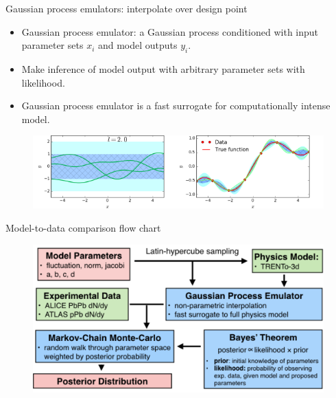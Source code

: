 \documentclass[11pt]{beamer}
\begin{document}
\begin{frame}{Gaussian process emulators: interpolate over design point}
\begin{itemize}
\item Gaussian process emulator: a Gaussian process conditioned with input parameter sets $x_i$ and model outputs $y_i$.
\item Make inference of model output with arbitrary parameter sets with likelihood.
\item Gaussian process emulator is a fast surrogate for computationally intense model.
\end{itemize}
\begin{center}
\begin{figure}
\includegraphics[width = 0.5\textwidth]{./pics/GP-1.png}\includegraphics[width = 0.5\textwidth]{./pics/GP-2.png}
\end{figure}
\end{center}
\end{frame}

\begin{frame}{Model-to-data comparison flow chart}
\begin{center}
\begin{figure}
\includegraphics[width=\textwidth]{./pics/flow-chart.png}
\end{figure}
\end{center}
\end{frame}
\end{document}
